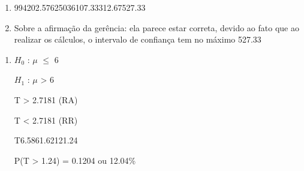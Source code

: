 
\begin{question}
    
    \begin{enumerate}[label={\textbf{\alph*)}}]
        
        \item 

            \begin{formula1}
                {99}{420}{2.576}{250}{36}{107.33}{312.67}{527.33}
            \end{formula1}

        \item 
    
            Sobre a afirmação da gerência: ela parece estar correta, devido ao fato que ao 
            realizar os cálculos, o intervalo de confiança tem no máximo 527.33

    \end{enumerate}
\end{question}


\begin{question}
    
    \begin{enumerate}[label={\textbf{\alph*)}}]
        
        \item 
    
            $H_0$ : $\mu$ $\leq$ 6 

            $H_1$ : $\mu$ > 6 
        
            T > 2.7181 (RA)

            T < 2.7181 (RR)

            \begin{formula7}
                {T}{6.58}{6}{1.62}{12}{1.24}
            \end{formula7}

            P(T > 1.24) = 0.1204 ou 12.04\%

    \end{enumerate}
\end{question}


